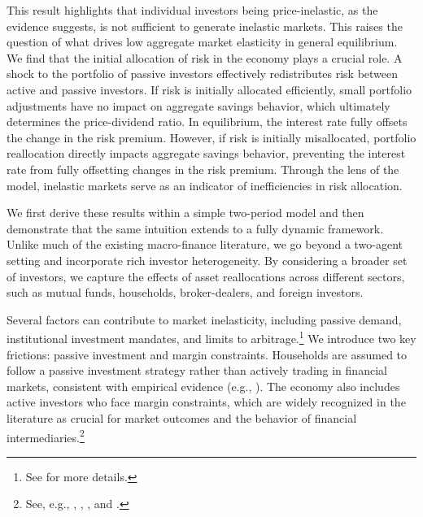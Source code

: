 This result highlights that individual investors being price-inelastic, as the evidence suggests, is not sufficient to generate inelastic markets. This raises the question of what drives low aggregate market elasticity in general equilibrium. We find that the initial allocation of risk in the economy plays a crucial role. A shock to the portfolio of passive investors effectively redistributes risk between active and passive investors. If risk is initially allocated efficiently, small portfolio adjustments have no impact on aggregate savings behavior, which ultimately determines the price-dividend ratio. In equilibrium, the interest rate fully offsets the change in the risk premium. However, if risk is initially misallocated, portfolio reallocation directly impacts aggregate savings behavior, preventing the interest rate from fully offsetting changes in the risk premium. Through the lens of the model, inelastic markets serve as an indicator of inefficiencies in risk allocation.
 
We first derive these results within a simple two-period model and then demonstrate that the same intuition extends to a fully dynamic framework. Unlike much of the existing macro-finance literature, we go beyond a two-agent setting and incorporate rich investor heterogeneity. By considering a broader set of investors, we capture the effects of asset reallocations across different sectors, such as mutual funds, households, broker-dealers, and foreign investors.

Several factors can contribute to market inelasticity, including passive demand, institutional investment mandates, and limits to arbitrage.\footnote{See \cite{gabaix2020search} for more details.} We introduce two key frictions: passive investment and margin constraints. Households are assumed to follow a passive investment strategy rather than actively trading in financial markets, consistent with empirical evidence (e.g., \citealp{brunnermeier2008wealth}). The economy also includes active investors who face margin constraints, which are widely recognized in the literature as crucial for market outcomes and the behavior of financial intermediaries.\footnote{See, e.g., \cite{brunnermeier2009market}, \cite{garleanu2011margin}, \cite{chabakauri2013dynamic}, and \cite{adrian2014procyclical}.}

